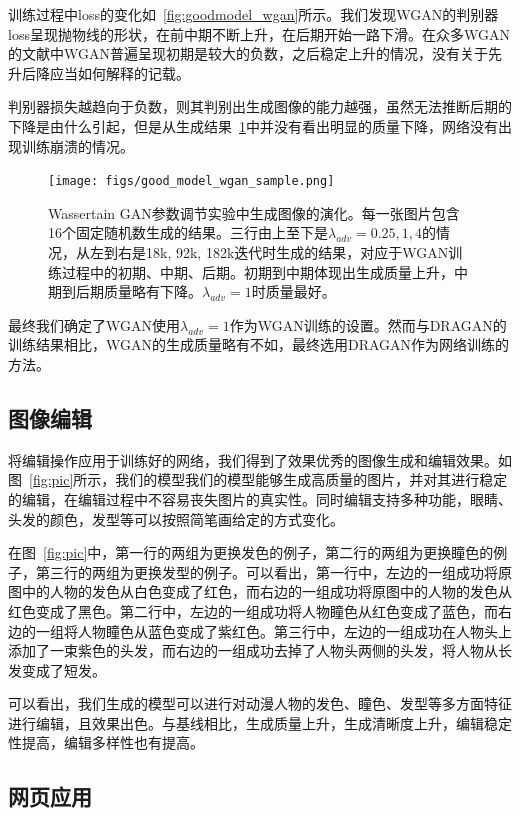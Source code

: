 \documentclass[a4paper,12pt,UTF8]{ctexart}
\newcommand{\kai}{\CJKfamily{zhkai}}	%
\begin{document}
训练过程中loss的变化如~\ref{fig:goodmodel_wgan}所示。我们发现WGAN的判别器loss呈现抛物线的形状，在前中期不断上升，在后期开始一路下滑。在众多WGAN的文献中WGAN普遍呈现初期是较大的负数，之后稳定上升的情况，没有关于先升后降应当如何解释的记载。

判别器损失越趋向于负数，则其判别出生成图像的能力越强，虽然无法推断后期的下降是由什么引起，但是从生成结果~\ref{fig:wgan_evolve}中并没有看出明显的质量下降，网络没有出现训练崩溃的情况。

\begin{figure}[H]
  \centering
  \texttt{[image: figs/good\_model\_wgan\_sample.png]}
  \caption{\kai Wassertain GAN参数调节实验中生成图像的演化。每一张图片包含16个固定随机数生成的结果。三行由上至下是$\lambda_{adv}=0.25, 1, 4$的情况，从左到右是18k, 92k, 182k迭代时生成的结果，对应于WGAN训练过程中的初期、中期、后期。初期到中期体现出生成质量上升，中期到后期质量略有下降。$\lambda_{adv}=1$时质量最好。}
  \label{fig:wgan_evolve}
\end{figure}

最终我们确定了WGAN使用$\lambda_{adv}=1$作为WGAN训练的设置。然而与DRAGAN的训练结果相比，WGAN的生成质量略有不如，最终选用DRAGAN作为网络训练的方法。

\subsection{图像编辑}

将编辑操作应用于训练好的网络，我们得到了效果优秀的图像生成和编辑效果。如图~\ref{fig:pic}所示，我们的模型我们的模型能够生成高质量的图片，并对其进行稳定的编辑，在编辑过程中不容易丧失图片的真实性。同时编辑支持多种功能，眼睛、头发的颜色，发型等可以按照简笔画给定的方式变化。

在图~\ref{fig:pic}中，第一行的两组为更换发色的例子，第二行的两组为更换瞳色的例子，第三行的两组为更换发型的例子。可以看出，第一行中，左边的一组成功将原图中的人物的发色从白色变成了红色，而右边的一组成功将原图中的人物的发色从红色变成了黑色。第二行中，左边的一组成功将人物瞳色从红色变成了蓝色，而右边的一组将人物瞳色从蓝色变成了紫红色。第三行中，左边的一组成功在人物头上添加了一束紫色的头发，而右边的一组成功去掉了人物头两侧的头发，将人物从长发变成了短发。

可以看出，我们生成的模型可以进行对动漫人物的发色、瞳色、发型等多方面特征进行编辑，且效果出色。与基线相比，生成质量上升，生成清晰度上升，编辑稳定性提高，编辑多样性也有提高。

\subsection{网页应用}
\end{document}
